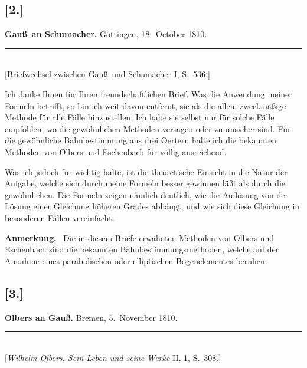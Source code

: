 \documentclass[12pt,a4paper]{article}
\theoremstyle{plain}
\theoremstyle{definition}
\theoremstyle{remark}
\begin{document}
\subsection*{[2.]}
\begin{center}
\textbf{Gau\ss\ an Schumacher.} G\"ottingen, 18.~October 1810.
\end{center}
\begin{center}
\rule{6cm}{0.4pt}\\[4pt]
[Briefwechsel zwischen Gau\ss\ und Schumacher I, S.~536.]
\end{center}

Ich danke Ihnen f\"ur Ihren freundschaftlichen Brief. Was die
Anwendung meiner Formeln betrifft, so bin ich weit davon entfernt,
sie als die allein zweckm\"a\ss ige Methode f\"ur alle F\"alle
hinzustellen. Ich habe sie selbst nur f\"ur solche F\"alle
empfohlen, wo die gew\"ohnlichen Methoden versagen oder zu
unsicher sind. F\"ur die gew\"ohnliche Bahnbestimmung aus drei
Oertern halte ich die bekannten Methoden von {\sc Olbers} und
{\sc Eschenbach} f\"ur v\"ollig ausreichend.

Was ich jedoch f\"ur wichtig halte, ist die theoretische
Einsicht in die Natur der Aufgabe, welche sich durch meine Formeln
besser gewinnen l\"a\ss t als durch die gew\"ohnlichen. Die Formeln
zeigen n\"amlich deutlich, wie die Aufl\"osung von der L\"osung einer
Gleichung h\"oheren Grades abh\"angt, und wie sich diese Gleichung
in besonderen F\"allen vereinfacht.

\medskip

\textbf{Anmerkung.} \ Die in diesem Briefe erw\"ahnten Methoden von
{\sc Olbers} und {\sc Eschenbach} sind die bekannten
Bahnbestimmungsmethoden, welche auf der Annahme eines parabolischen
oder elliptischen Bogenelementes beruhen.


\subsection*{[3.]}
\begin{center}
\textbf{Olbers an Gau\ss.} Bremen, 5.~November 1810.
\end{center}
\begin{center}
\rule{6cm}{0.4pt}\\[4pt]
[{\it Wilhelm Olbers, Sein Leben und seine Werke} II, 1, S.~308.]
\end{center}
\end{document}
